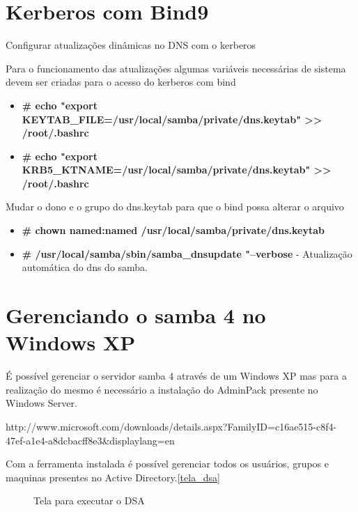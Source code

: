 \section{Kerberos com Bind9}

Configurar atualizações dinâmicas no DNS com o kerberos

Para o funcionamento das atualizações algumas variáveis necessárias de sistema devem ser criadas para o acesso do kerberos com bind

\begin{itemize}
	\item \textbf{\# echo "export KEYTAB\_FILE=/usr/local/samba/private/dns.keytab" >> /root/.bashrc}
	\item \textbf{\# echo "export KRB5\_KTNAME=/usr/local/samba/private/dns.keytab" >> /root/.bashrc}
\end{itemize}

Mudar o dono e o grupo do dns.keytab para que o bind possa alterar o arquivo

\begin{itemize}
	\item \textbf{\# chown named:named /usr/local/samba/private/dns.keytab}
	\item \textbf{\# /usr/local/samba/sbin/samba\_dnsupdate "--verbose} - Atualização automática do dns do samba.
\end{itemize}

\section{Gerenciando o samba 4 no Windows XP}

É possível gerenciar o servidor samba 4 através de um Windows XP mas para a realização do mesmo é necessário a instalação do AdminPack presente no Windows Server.

http://www.microsoft.com/downloads/details.aspx?FamilyID=c16ae515-c8f4-47ef-a1e4-a8dcbacff8e3\&displaylang=en 

Com a ferramenta instalada é possível gerenciar todos os usuários, grupos e maquinas presentes no Active Directory.\ref{tela_dsa}

\begin{figure}[ht]
   	\centering
   	\caption{Tela para executar o DSA}
    \label{dsa}
\end{figure}

